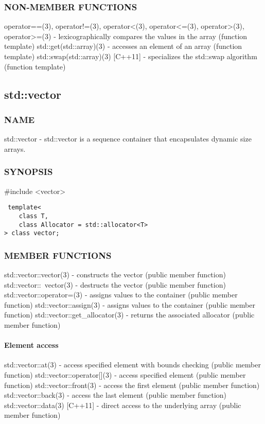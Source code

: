 \subsubsection{NON-MEMBER FUNCTIONS}
operator==(3), operator!=(3), operator<(3), operator<=(3), operator>(3), operator>=(3) - lexicographically compares the values in the array   (function template)
std::get(std::array)(3) - accesses an element of an array   (function template)
std::swap(std::array)(3) [C++11] - specializes the std::swap algorithm   (function template)


\subsection{std::vector}

\subsubsection{NAME}
std::vector - std::vector is a sequence container that encapsulates dynamic size arrays.

\subsubsection{SYNOPSIS}
\#include <vector>

\begin{lstlisting}
 template<
    class T,
    class Allocator = std::allocator<T>
> class vector;
\end{lstlisting}

\subsubsection{MEMBER FUNCTIONS}
std::vector::vector(3) - constructs the vector  (public member function)
std::vector::~vector(3) - destructs the vector  (public member function)
std::vector::operator=(3) - assigns values to the container   (public member function)
std::vector::assign(3) - assigns values to the container   (public member function)
std::vector::get\_allocator(3) - returns the associated allocator   (public member function)
\paragraph{Element access}
std::vector::at(3) - access specified element with bounds checking   (public member function)
std::vector::operator[](3) - access specified element   (public member function)
std::vector::front(3) - access the first element   (public member function)
std::vector::back(3) - access the last element   (public member function)
std::vector::data(3) [C++11] - direct access to the underlying array   (public member function)
